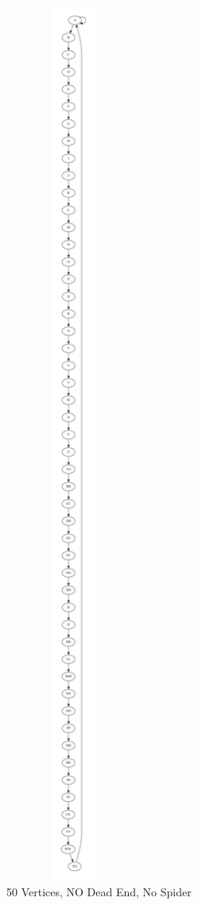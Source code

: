 \documentclass{article}
\begin{document}
\begin{figure}
  \centering
  \includegraphics[width=0.4\textwidth]{graph5.pdf}
  \caption{50 Vertices, NO Dead End, No Spider}
  \label{fig:image_label}
\end{figure}
\end{document}
